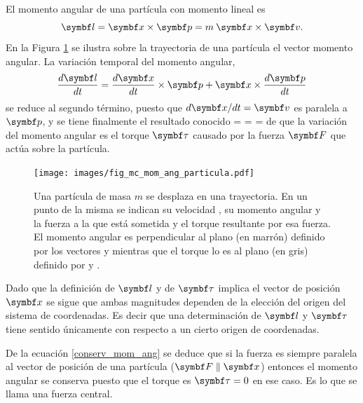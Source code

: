 \documentclass[10pt,oneside]{CBFT_book}
\begin{document}
El momento angular de una partícula con momento lineal  es 
\[
	\vb{l} = \vb{x} \times \vb{p} = m \: \vb{x} \times \vb{v}.
\]
En la Figura 
\ref{fig_mc_mom_ang_particula} se ilustra sobre la trayectoria de una partícula el vector momento angular. 
La variación temporal del momento angular,
\[
	\dtot{\vb{l}}{t} = \dtot{\vb{x}}{t} \times \vb{p} + \vb{x} \times \dtot{\vb{p}}{t} 
\]
se reduce al segundo término, puesto que $ d\vb{x}/dt = \vb{v} $ es paralela a $ \vb{p} $, y
se tiene finalmente el resultado conocido
\be
	 =  \times {} =  \times {} = \vb{\tau}
	\label{conserv_mom_ang}
\ee
de que la variación del momento angular es el torque $\vb{\tau}$ causado por la fuerza $ \vb{F} $ 
que actúa sobre la partícula.

\begin{figure}[hbt]
	\begin{center}
	\texttt{[image: images/fig\_mc\_mom\_ang\_particula.pdf]}	
	\end{center}
	\caption{Una partícula de masa $m$ se desplaza en una trayectoria. En un punto  de la misma se
	indican su velocidad , su momento angular  y la fuerza  a la que está sometida y el
	torque resultante \vb{\tau} por esa fuerza.
	El momento angular es perpendicular al plano (en marrón) definido por los vectores  y  mientras que 
	el torque lo es al plano (en gris) definido por  y .}
	\label{fig_mc_mom_ang_particula}
\end{figure} 

Dado que la definición de $ \vb{l} $ y de $ \vb{\tau} $ implica el vector de posición $ \vb{x} $ se sigue que ambas 
magnitudes dependen de la elección del origen del sistema de coordenadas. 
Es decir que una determinación de $ \vb{l} $ y $ \vb{\tau} $ tiene sentido únicamente con respecto a un cierto origen 
de coordenadas.

De la ecuación \eqref{conserv_mom_ang} se deduce que si la fuerza es siempre paralela al vector de posición de una 
partícula ($\vb{F} \parallel \vb{x}$) entonces el momento angular  se conserva puesto que el torque es 
$\vb{\tau}=0$ en ese caso. Es lo que se llama una fuerza central.
\end{document}
